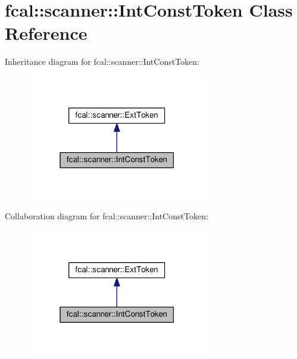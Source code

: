 \hypertarget{classfcal_1_1scanner_1_1IntConstToken}{}\section{fcal\+:\+:scanner\+:\+:Int\+Const\+Token Class Reference}
\label{classfcal_1_1scanner_1_1IntConstToken}


Inheritance diagram for fcal\+:\+:scanner\+:\+:Int\+Const\+Token\+:\nopagebreak
\begin{figure}[H]
\begin{center}
\leavevmode
\includegraphics[width=223pt]{classfcal_1_1scanner_1_1IntConstToken__inherit__graph}
\end{center}
\end{figure}


Collaboration diagram for fcal\+:\+:scanner\+:\+:Int\+Const\+Token\+:\nopagebreak
\begin{figure}[H]
\begin{center}
\leavevmode
\includegraphics[width=223pt]{classfcal_1_1scanner_1_1IntConstToken__coll__graph}
\end{center}
\end{figure}
